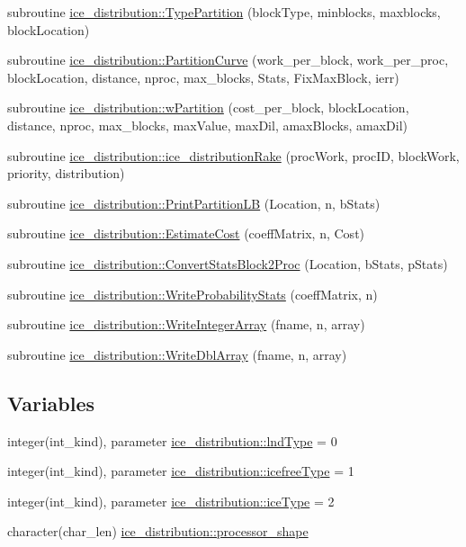 \begin{DoxyCompactItemize}
subroutine \hyperlink{namespaceice__distribution_a9dcac951f0df38305378d4edc49b40ae}{ice\_\-distribution::TypePartition} (blockType, minblocks, maxblocks, blockLocation)
\item 
subroutine \hyperlink{namespaceice__distribution_abcbf14893b6e339874e46663dd6d9640}{ice\_\-distribution::PartitionCurve} (work\_\-per\_\-block, work\_\-per\_\-proc, blockLocation, distance, nproc, max\_\-blocks, Stats, FixMaxBlock, ierr)
\item 
subroutine \hyperlink{namespaceice__distribution_a209b009c99baf5ef254c40774baeaccc}{ice\_\-distribution::wPartition} (cost\_\-per\_\-block, blockLocation, distance, nproc, max\_\-blocks, maxValue, maxDil, amaxBlocks, amaxDil)
\item 
subroutine \hyperlink{namespaceice__distribution_aa6d69913a71458cdcb71836b2c12c941}{ice\_\-distribution::ice\_\-distributionRake} (procWork, procID, blockWork, priority, distribution)
\item 
subroutine \hyperlink{namespaceice__distribution_abcbe271722878acfc0ee93ce9d8a1342}{ice\_\-distribution::PrintPartitionLB} (Location, n, bStats)
\item 
subroutine \hyperlink{namespaceice__distribution_ad81ef2e05e7990db5bd6ed4d80cc6761}{ice\_\-distribution::EstimateCost} (coeffMatrix, n, Cost)
\item 
subroutine \hyperlink{namespaceice__distribution_a672be5ed19afd4bc4b99de14c174471e}{ice\_\-distribution::ConvertStatsBlock2Proc} (Location, bStats, pStats)
\item 
subroutine \hyperlink{namespaceice__distribution_afb1f8a57908d1a795f7976247cfd935c}{ice\_\-distribution::WriteProbabilityStats} (coeffMatrix, n)
\item 
subroutine \hyperlink{namespaceice__distribution_a671ab022211c1686b8fd0adf14d752b5}{ice\_\-distribution::WriteIntegerArray} (fname, n, array)
\item 
subroutine \hyperlink{namespaceice__distribution_a273a42a83659ff86cfa8099c186ec503}{ice\_\-distribution::WriteDblArray} (fname, n, array)
\end{DoxyCompactItemize}
\subsection*{Variables}
\begin{DoxyCompactItemize}
\item 
integer(int\_\-kind), parameter \hyperlink{namespaceice__distribution_a70c7db6c7a84f62b66e1a5880040b9aa}{ice\_\-distribution::lndType} = 0
\item 
integer(int\_\-kind), parameter \hyperlink{namespaceice__distribution_a9a24a6c9c4809cf7bcc2f823d5658e91}{ice\_\-distribution::icefreeType} = 1
\item 
integer(int\_\-kind), parameter \hyperlink{namespaceice__distribution_ad7d8ab8d3b272938146dae0343de0ffb}{ice\_\-distribution::iceType} = 2
\item 
character(char\_\-len) \hyperlink{namespaceice__distribution_a3f7e1befe15a2793e62360b81c5fa130}{ice\_\-distribution::processor\_\-shape}
\end{DoxyCompactItemize}
